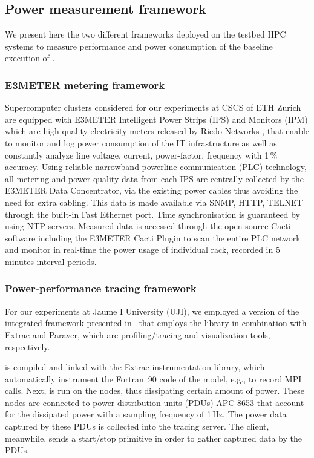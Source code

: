 \subsection{Power measurement framework}
\label{subsec:3.3}

We present here the two different  frameworks deployed on the testbed HPC systems to
measure  performance and  power  consumption of the baseline execution of \cosmoart.

\subsubsection{E3METER metering framework}

Supercomputer  clusters considered  for our  experiments at CSCS of ETH Zurich are equipped with
E3METER Intelligent  Power Strips (IPS)  and Monitors (IPM)  which are
high   quality   electricity  meters   released   by  Riedo   Networks
\citep{Riedonetworks},   that  enable   to  monitor   and   log  power
consumption  of the IT  infrastructure as  well as  constantly analyze
line  voltage,  current, power-factor,  frequency  with 1\,\%  accuracy.
Using  reliable narrowband  powerline communication  (PLC) technology,
all  metering and  power  quality  data from  each  IPS are  centrally
collected  by the E3METER  Data Concentrator,  via the  existing power
cables thus  avoiding the need for  extra cabling.  This  data is made
available via  SNMP, HTTP, TELNET  through the built-in  Fast Ethernet
port.   Time  synchronisation  is  guaranteed by  using  NTP  servers.
Measured  data is  accessed  through the  open  source Cacti  software
including the E3METER Cacti Plugin  to scan the entire PLC network and
monitor in real-time the power usage of individual rack, recorded in 5
minutes interval periods.

\subsubsection{Power-performance tracing framework}

For our experiments at Jaume I University (UJI), we employed a version
of the integrated framework presented in~\cite{energy13} that employs the \pmlib library in
combination with Extrae and Paraver, which  are profiling/tracing and
visualization tools, respectively.

\cosmoart  is compiled and linked with the Extrae instrumentation library,
which automatically  instrument the Fortran~90 code of the model, e.g., to record MPI calls.  Next, \cosmoart  is  run on  the  nodes,  thus dissipating  certain
amount  of power.   These  nodes are connected to power distribution units (PDUs)
APC 8653 that account for the dissipated power with a sampling frequency of 1\,Hz. The power data captured by these PDUs is collected into the tracing server. The client,  meanwhile, sends a start/stop  primitive  in  order  to  gather  captured  data  by  the PDUs.

